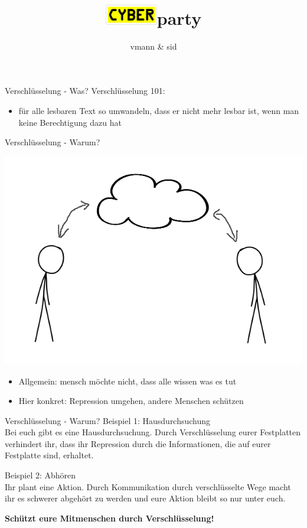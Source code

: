 \documentclass{beamer}
\title{\bf\fontsize{51.59pt}{51.59pt}\selectfont\includegraphics[align=c,height=1.2em]{cyber.png}party}
\author{vmann \& sid}
\date{}
\begin{document}
\begin{frame}
    \titlepage
\end{frame}

\begin{frame}{Verschlüsselung - Was?}
	Verschlüsselung 101: 
	\begin{itemize}
		\item für alle lesbaren Text so umwandeln, dass er nicht mehr lesbar ist, wenn man keine Berechtigung dazu hat
	\end{itemize}		
\end{frame}

\begin{frame}{Verschlüsselung - Warum?}
    \begin{center}
        \includegraphics[height=0.6\textheight]{thecloud.png}
    \end{center}
	\begin{itemize}
		\item Allgemein: mensch möchte nicht, dass alle wissen was es tut
		\item Hier konkret: Repression umgehen, andere Menschen schützen
	\end{itemize}
\end{frame}

\begin{frame}{Verschlüsselung - Warum?}
	Beispiel 1: Hausdurchsuchung\\
	Bei euch gibt es eine Hausdurchsuchung. Durch Verschlüsselung eurer Festplatten verhindert ihr, dass ihr Repression durch die Informationen, die auf eurer Festplatte sind, erhaltet.
	\\\hspace{1cm}
	
	Beispiel 2: Abhören\\
	Ihr plant eine Aktion. Durch Kommunikation durch verschlüsselte Wege macht ihr es schwerer abgehört zu werden und eure Aktion bleibt so nur unter euch.
	\\\hspace{1cm}
	
	\textbf{Schützt eure Mitmenschen durch Verschlüsselung!}	
\end{frame}
\end{document}
